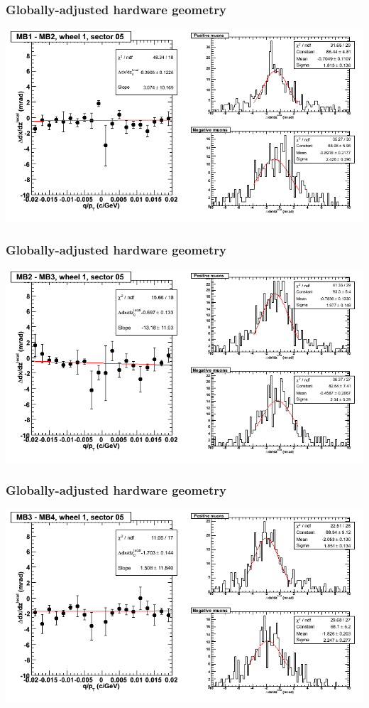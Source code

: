 \documentclass[compress]{beamer}
\begin{document}
\begin{frame}
\frametitle{Globally-adjusted hardware geometry}
\includegraphics[width=\linewidth]{NOV4_segdiffs_HW/dt13_slope_D_05_12.png}
\end{frame}

\begin{frame}
\frametitle{Globally-adjusted hardware geometry}
\includegraphics[width=\linewidth]{NOV4_segdiffs_HW/dt13_slope_D_05_23.png}
\end{frame}

\begin{frame}
\frametitle{Globally-adjusted hardware geometry}
\includegraphics[width=\linewidth]{NOV4_segdiffs_HW/dt13_slope_D_05_34.png}
\end{frame}
\end{document}

